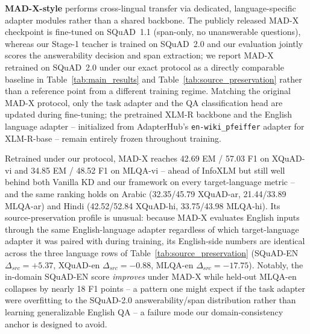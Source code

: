 \documentclass[11pt]{article}
\begin{document}
\textbf{MAD-X-style}
\label{sec:appendix_madx}
\citep{pfeiffer-etal-2020-mad} performs cross-lingual transfer via dedicated, language-specific adapter modules rather than a shared backbone. The publicly released MAD-X checkpoint is fine-tuned on SQuAD~1.1 (span-only, no unanswerable questions), whereas our Stage-1 teacher is trained on SQuAD~2.0 and our evaluation jointly scores the answerability decision and span extraction; we report MAD-X retrained on SQuAD~2.0 under our exact protocol as a directly comparable baseline in Table~\ref{tab:main_results} and Table~\ref{tab:source_preservation} rather than a reference point from a different training regime. Matching the original MAD-X protocol, only the task adapter and the QA classification head are updated during fine-tuning; the pretrained XLM-R backbone and the English language adapter -- initialized from AdapterHub's \texttt{en-wiki\_pfeiffer} adapter for XLM-R-base -- remain entirely frozen throughout training.

Retrained under our protocol, MAD-X reaches 42.69 EM / 57.03 F1 on XQuAD-vi and 34.85 EM / 48.52 F1 on MLQA-vi -- ahead of InfoXLM but still well behind both Vanilla KD and our framework on every target-language metric -- and the same ranking holds on Arabic (32.35/45.79 XQuAD-ar, 21.44/33.89 MLQA-ar) and Hindi (42.52/52.84 XQuAD-hi, 33.75/43.98 MLQA-hi). Its source-preservation profile is unusual: because MAD-X evaluates English inputs through the same English-language adapter regardless of which target-language adapter it was paired with during training, its English-side numbers are identical across the three language rows of Table~\ref{tab:source_preservation} (SQuAD-EN $\Delta_{src}=+5.37$, XQuAD-en $\Delta_{src}=-0.88$, MLQA-en $\Delta_{src}=-17.75$). Notably, the in-domain SQuAD-EN score \emph{improves} under MAD-X while held-out MLQA-en collapses by nearly 18 F1 points -- a pattern one might expect if the task adapter were overfitting to the SQuAD-2.0 answerability/span distribution rather than learning generalizable English QA -- a failure mode our domain-consistency anchor is designed to avoid.
\end{document}
